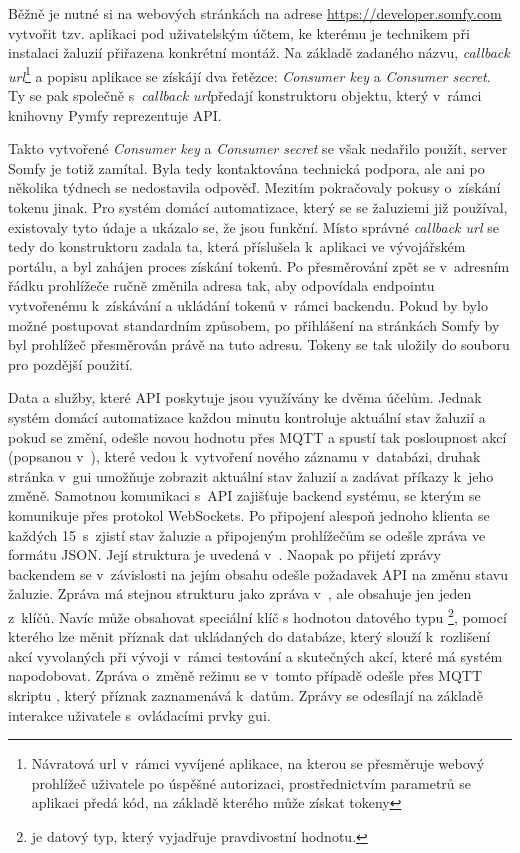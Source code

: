     Běžně je nutné si na webových stránkách na adrese \href{https://develeoper.somfy.com}{https://developer.som\-fy.com} vytvořit tzv. aplikaci pod uživatelským účtem, ke kterému je technikem při instalaci žaluzií přiřazena konkrétní montáž. Na základě zadaného názvu, \emph{callback \acrshort{url}}\footnote[1]{Návratová \acrshort{url} v~rámci vyvíjené aplikace, na kterou se přesměruje webový prohlížeč uživatele po úspěšné autorizaci, prostřednictvím parametrů se aplikaci předá kód, na základě kterého může získat tokeny} a popisu aplikace se získájí dva řetězce: \emph{Consumer key} a \emph{Consumer secret}.\cite{somfy:api} Ty se pak společně s~\emph{callback \acrshort{url}}\footnotemark[1] předají konstruktoru objektu, který v~rámci knihovny Pymfy reprezentuje API.\cite{tetienne:pymfy}

    Takto vytvořené \emph{Consumer key} a \emph{Consumer secret} se však nedařilo použít, server Somfy je totiž zamítal. Byla tedy kontaktována technická podpora, ale ani po několika týdnech se nedostavila odpověď. Mezitím pokračovaly pokusy o~získání tokenu jinak. Pro systém domácí automatizace, který se se žaluziemi již používal, existovaly tyto údaje a ukázalo se, že jsou funkční. Místo správné \emph{callback \acrshort{url}} se tedy do konstruktoru zadala ta, která příslušela k~aplikaci ve vývojářském portálu, a byl zahájen proces získání tokenů. Po přesměrování zpět se v~adresním řádku prohlížeče ručně změnila adresa tak, aby odpovídala endpointu vytvořenému k~získávání a ukládání tokenů v~rámci backendu. Pokud by bylo možné postupovat standardním způsobem, po přihlášení na stránkách Somfy by byl prohlížeč přesměrován právě na tuto adresu. Tokeny se tak uložily do souboru  pro pozdější použití.

    Data a služby, které API poskytuje jsou využívány ke dvěma účelům. Jednak systém domácí automatizace každou minutu kontroluje aktuální stav žaluzií a pokud se změní, odešle novou hodnotu přes MQTT a spustí tak posloupnost akcí (popsanou v~), které vedou k~vytvoření nového záznamu v~databázi, druhak stránka  v~\acrshort{gui} umožňuje zobrazit aktuální stav žaluzií a zadávat příkazy k~jeho změně. Samotnou komunikaci s~API zajišťuje backend systému, se kterým se komunikuje přes protokol WebSockets. Po připojení alespoň jednoho klienta se každých 15~s~zjistí stav žaluzie a připojeným prohlížečům se odešle zpráva ve formátu JSON. Její struktura je uvedená v~. Naopak po přijetí zprávy backendem se v~závislosti na jejím obsahu odešle požadavek API na změnu stavu žaluzie. Zpráva má stejnou strukturu jako zpráva v~, ale obsahuje jen jeden z~klíčů. Navíc může obsahovat speciální klíč  s hodnotou datového typu \footnote{ je datový typ, který vyjadřuje pravdivostní hodnotu.}, pomocí kterého lze měnit příznak  dat ukládaných do databáze, který slouží k~rozlišení akcí vyvolaných při vývoji v~rámci testování a skutečných akcí, které má systém napodobovat. Zpráva o~změně režimu se v~tomto případě odešle přes MQTT skriptu , který příznak zaznamenává k~datům. Zprávy se odesílají na základě interakce uživatele s~ovládacími prvky \acrshort{gui}.


